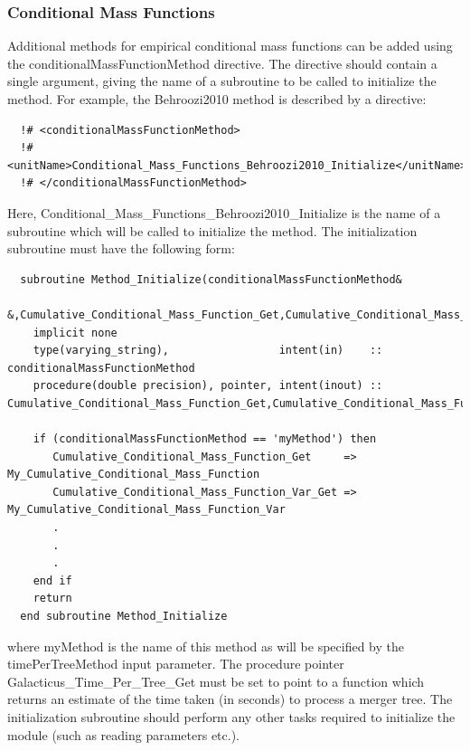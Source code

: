 \subsubsection{Conditional Mass Functions}

Additional methods for empirical conditional mass functions can be added using the {\normalfont \ttfamily conditionalMassFunctionMethod} directive. The directive should contain a single argument, giving the name of a subroutine to be called to initialize the method. For example, the {\normalfont \ttfamily Behroozi2010} method is described by a directive:
\begin{verbatim}
  !# <conditionalMassFunctionMethod>
  !#  <unitName>Conditional_Mass_Functions_Behroozi2010_Initialize</unitName>
  !# </conditionalMassFunctionMethod>
\end{verbatim}
Here, {\normalfont \ttfamily Conditional\_Mass\_Functions\_Behroozi2010\_Initialize} is the name of a subroutine which will be called to initialize the method. The initialization subroutine must have the following form:
\begin{verbatim}
  subroutine Method_Initialize(conditionalMassFunctionMethod&
       &,Cumulative_Conditional_Mass_Function_Get,Cumulative_Conditional_Mass_Function_Var_Get)
    implicit none
    type(varying_string),                 intent(in)    :: conditionalMassFunctionMethod
    procedure(double precision), pointer, intent(inout) :: Cumulative_Conditional_Mass_Function_Get,Cumulative_Conditional_Mass_Function_Var_Get
    
    if (conditionalMassFunctionMethod == 'myMethod') then
       Cumulative_Conditional_Mass_Function_Get     => My_Cumulative_Conditional_Mass_Function
       Cumulative_Conditional_Mass_Function_Var_Get => My_Cumulative_Conditional_Mass_Function_Var
       .
       .
       .
    end if
    return
  end subroutine Method_Initialize
\end{verbatim}
where {\normalfont \ttfamily myMethod} is the name of this method as will be specified by the {\normalfont \ttfamily timePerTreeMethod} input parameter. The procedure pointer {\normalfont \ttfamily Galacticus\_Time\_Per\_Tree\_Get} must be set to point to a function which returns an estimate of the time taken (in seconds) to process a merger tree. The initialization subroutine should perform any other tasks required to initialize the module (such as reading parameters etc.).

